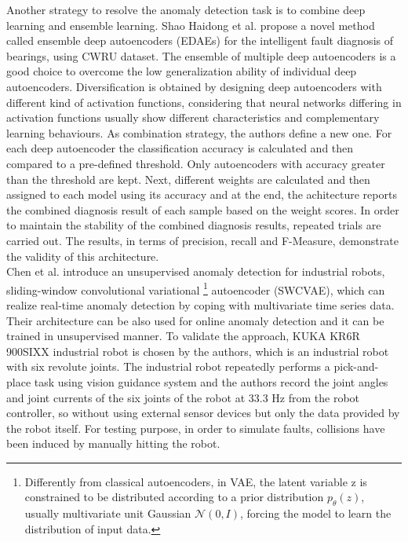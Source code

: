 Another strategy to resolve the anomaly detection task is to combine deep learning and ensemble learning. Shao Haidong et al. \cite{14NovelMethodEnsembleDeepAutoencoder} propose a novel method called ensemble deep autoencoders (EDAEs) for the intelligent fault diagnosis of bearings, using CWRU dataset. The ensemble of multiple deep autoencoders is a good choice to overcome the low generalization ability of individual deep autoencoders. Diversification is obtained by designing deep autoencoders with different kind of activation functions, considering that neural networks differing in activation functions usually show different characteristics and complementary learning behaviours. As combination strategy, the authors define a new one. For each deep autoencoder the classification accuracy is calculated and then compared to a pre-defined threshold. Only autoencoders with accuracy greater than the threshold are kept. Next, different weights are calculated and then assigned to each model using its accuracy and at the end, the achitecture reports the combined diagnosis result of each sample based on the weight scores. In order to maintain the stability of the combined diagnosis results, repeated trials are carried out. The results, in terms of precision, recall and F-Measure, demonstrate the validity of this architecture.\\
Chen et al. \cite{21RobotAnomalyDetection} introduce an unsupervised anomaly detection for industrial robots, sliding-window convolutional variational \footnote{Differently from classical autoencoders, in VAE, the latent variable z is constrained to be distributed according to a prior distribution $p_\theta (z)$, usually multivariate unit Gaussian $\mathcal{N}(0,I)$, forcing the model to learn the distribution of input data.}
autoencoder (SWCVAE), which can realize real-time anomaly detection by coping with multivariate time series data. Their architecture can be also used for online anomaly detection and it can be trained in unsupervised manner. To validate the approach, KUKA KR6R 900SIXX industrial robot is chosen by the authors, which is an industrial robot with six revolute joints. The industrial robot repeatedly performs a pick-and-place task using vision guidance system and the authors record the joint angles and joint currents of the six joints of the robot at 33.3 Hz from the robot controller, so without using external sensor devices but only the data provided by the robot itself. For testing purpose, in order to simulate faults, collisions have been induced by manually hitting the robot.

